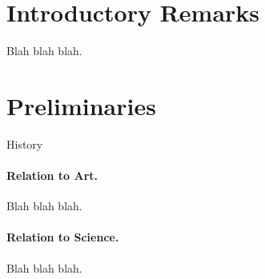 
\section{Introductory Remarks}

Blah blah blah.

\section{Preliminaries}

History \cite{DuRa01}

\paragraph{Relation to Art.} 
Blah blah blah.

\paragraph{Relation to Science.} 
Blah blah blah.

